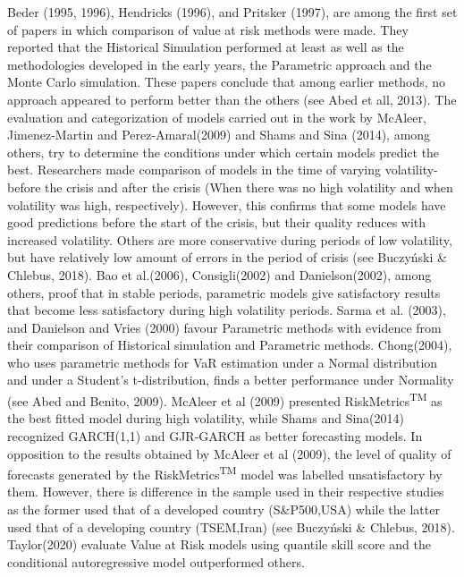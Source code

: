 \documentclass[a4paper,11pt,oneside]{book}
\begin{document}
Beder (1995, 1996), Hendricks (1996), and
Pritsker (1997), are among the first set of papers in which comparison of value at risk methods were made. They reported that the Historical Simulation performed at least as well as the methodologies developed in the early years, the Parametric approach and the Monte Carlo simulation. These papers conclude that among earlier methods, no approach appeared to perform better than the
others (see Abed et all, 2013). The evaluation and categorization of models carried out in the work by McAleer, Jimenez-Martin and Perez-Amaral(2009) and Shams and Sina (2014), among others, try to determine the conditions under which certain models predict the best. Researchers made comparison of models in the time of varying volatility-before the crisis and after the crisis (When there was no high volatility and when volatility was high, respectively). However, this confirms that some models have good predictions before the start of the crisis, but their quality reduces with increased volatility. Others are more conservative during periods of low volatility, but have relatively low amount of errors in the period of crisis (see Buczyński \& Chlebus, 2018).
\newline\newline
Bao et al.(2006), Consigli(2002) and Danielson(2002), among
others, proof that in stable periods, parametric models give satisfactory results
that become less satisfactory during high volatility periods. Sarma et al. (2003), and Danielson and Vries (2000) favour Parametric methods with evidence from their comparison of Historical simulation and Parametric methods. Chong(2004),
who uses parametric methods for VaR estimation under a Normal distribution and under a
Student’s t-distribution, finds a better performance under Normality (see Abed and Benito, 2009). McAleer et al (2009) presented RiskMetrics\textsuperscript{TM} as
the best fitted model during high volatility, while Shams and Sina(2014) recognized GARCH(1,1) and GJR-GARCH as better
forecasting models. In opposition to the results obtained
by McAleer et al (2009), the level of quality of forecasts
generated by the RiskMetrics\textsuperscript{TM} model was labelled
unsatisfactory by them. However, there is difference in the sample used in their respective studies as the former used that of a developed country (S\&P500,USA) while the latter used that of a developing  country (TSEM,Iran) (see Buczyński \& Chlebus, 2018). Taylor(2020) evaluate Value at Risk models using quantile skill score and the conditional autoregressive model outperformed others.
\end{document}
